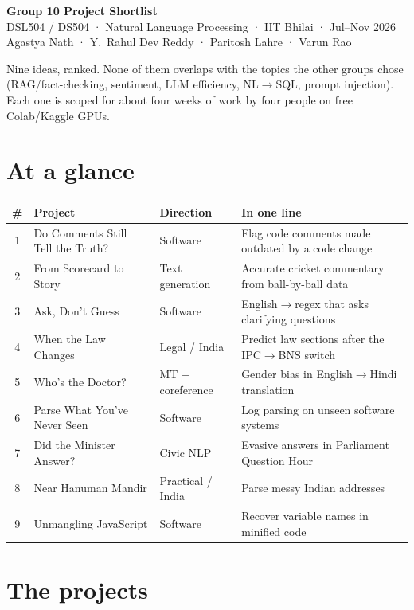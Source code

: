 \documentclass[11pt,a4paper]{article}
\begin{document}
\begin{center}
  {\LARGE\bfseries\color{navy} Group 10 Project Shortlist}\\[4pt]
  {\small DSL504 / DS504 · Natural Language Processing · IIT Bhilai · Jul--Nov 2026}\\[2pt]
  {\small Agastya Nath · Y.\ Rahul Dev Reddy · Paritosh Lahre · Varun Rao}
\end{center}

\vspace{4pt}
Nine ideas, ranked. None of them overlaps with the topics the other groups chose
(RAG/fact-checking, sentiment, LLM efficiency, NL$\to$SQL, prompt injection).
Each one is scoped for about four weeks of work by four people on free Colab/Kaggle GPUs.

\section*{At a glance}

\renewcommand{\arraystretch}{1.25}
\begin{tabularx}{\textwidth}{@{}c l l >{\raggedright\arraybackslash}X@{}}
\toprule
\textbf{\#} & \textbf{Project} & \textbf{Direction} & \textbf{In one line} \\
\midrule
1 & Do Comments Still Tell the Truth? & Software & Flag code comments made outdated by a code change \\
2 & From Scorecard to Story & Text generation & Accurate cricket commentary from ball-by-ball data \\
3 & Ask, Don't Guess & Software & English$\to$regex that asks clarifying questions \\
4 & When the Law Changes & Legal / India & Predict law sections after the IPC$\to$BNS switch \\
5 & Who's the Doctor? & MT + coreference & Gender bias in English$\to$Hindi translation \\
6 & Parse What You've Never Seen & Software & Log parsing on unseen software systems \\
7 & Did the Minister Answer? & Civic NLP & Evasive answers in Parliament Question Hour \\
8 & Near Hanuman Mandir & Practical / India & Parse messy Indian addresses \\
9 & Unmangling JavaScript & Software & Recover variable names in minified code \\
\bottomrule
\end{tabularx}

\section*{The projects}
\end{document}
